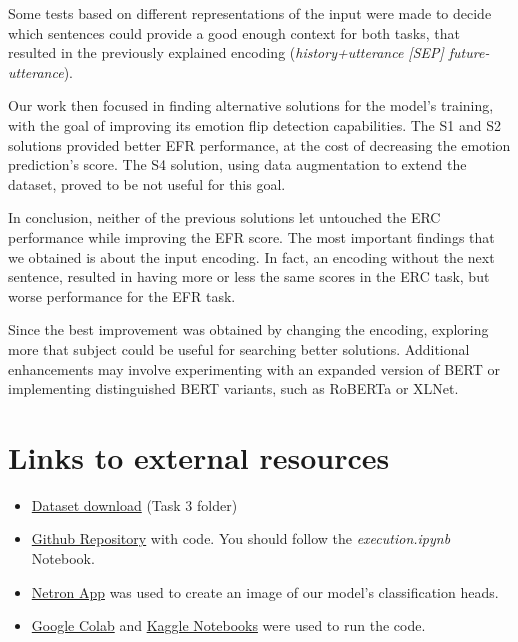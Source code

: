 \documentclass[11pt,table,xcdraw]{article}
\begin{document}
Some tests based on different representations of the input were made to decide which sentences could provide a good enough context for both tasks, that resulted in the previously explained encoding (\textit{history+utterance [SEP] future-utterance}).

Our work then focused in finding alternative solutions for the model's training, with the goal of improving its emotion flip detection capabilities. The S1 and S2 solutions provided better EFR performance, at the cost of decreasing the emotion prediction's score. The S4 solution, using data augmentation to extend the dataset, proved to be not useful for this goal.

In conclusion, neither of the previous solutions let untouched the ERC performance while improving the EFR score. The most important findings that we obtained is about the input encoding. In fact, an encoding without the next sentence, resulted in having more or less the same scores in the ERC task, but worse performance for the EFR task.

Since the best improvement was obtained by changing the encoding, exploring more that subject could be useful for searching better solutions. Additional enhancements may involve experimenting with an expanded version of BERT or implementing distinguished BERT variants, such as RoBERTa or XLNet. 






\section{Links to external resources}
\label{sec:links}
\begin{itemize}
    \item \href{https://drive.google.com/drive/folders/16mFdhXGECdcyDjLs_alI43W4iNQK_47B}{Dataset download} (Task 3 folder)
    \item \href{https://github.com/Danysan1/ai-unibo-nlp-project/tree/main/final}{Github Repository} with code. You should follow the \textit{execution.ipynb} Notebook.
    \item \href{https://netron.app/}{Netron App} was used to create an image of our model's classification heads.
    \item \href{https://colab.research.google.com/}{Google Colab} and \href{https://www.kaggle.com/code/}{Kaggle Notebooks} were used to run the code.
\end{itemize}
\end{document}
